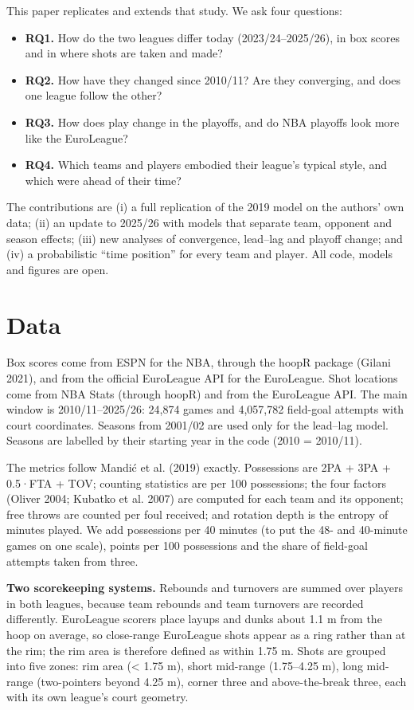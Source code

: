 \documentclass[
  11pt,
  a4paper,
]{article}
\providecommand{\tightlist}{%
  \setlength{\itemsep}{0pt}\setlength{\parskip}{0pt}}\usepackage{longtable,booktabs,array}
\begin{document}
This paper replicates and extends that study. We ask four questions:

\begin{itemize}
\tightlist
\item
  \textbf{RQ1.} How do the two leagues differ today (2023/24--2025/26),
  in box scores and in where shots are taken and made?
\item
  \textbf{RQ2.} How have they changed since 2010/11? Are they
  converging, and does one league follow the other?
\item
  \textbf{RQ3.} How does play change in the playoffs, and do NBA
  playoffs look more like the EuroLeague?
\item
  \textbf{RQ4.} Which teams and players embodied their league's typical
  style, and which were ahead of their time?
\end{itemize}

The contributions are (i) a full replication of the 2019 model on the
authors' own data; (ii) an update to 2025/26 with models that separate
team, opponent and season effects; (iii) new analyses of convergence,
lead--lag and playoff change; and (iv) a probabilistic ``time position''
for every team and player. All code, models and figures are open.

\section{Data}\label{data}

Box scores come from ESPN for the NBA, through the hoopR package (Gilani
2021), and from the official EuroLeague API for the EuroLeague. Shot
locations come from NBA Stats (through hoopR) and from the EuroLeague
API. The main window is 2010/11--2025/26: 24,874 games and 4,057,782
field-goal attempts with court coordinates. Seasons from 2001/02 are
used only for the lead--lag model. Seasons are labelled by their
starting year in the code (2010 = 2010/11).

The metrics follow Mandić et al. (2019) exactly. Possessions are 2PA +
3PA + 0.5·FTA + TOV; counting statistics are per 100 possessions; the
four factors (Oliver 2004; Kubatko et al. 2007) are computed for each
team and its opponent; free throws are counted per foul received; and
rotation depth is the entropy of minutes played. We add possessions per
40 minutes (to put the 48- and 40-minute games on one scale), points per
100 possessions and the share of field-goal attempts taken from three.

\textbf{Two scorekeeping systems.} Rebounds and turnovers are summed
over players in both leagues, because team rebounds and team turnovers
are recorded differently. EuroLeague scorers place layups and dunks
about 1.1 m from the hoop on average, so close-range EuroLeague shots
appear as a ring rather than at the rim; the rim area is therefore
defined as within 1.75 m. Shots are grouped into five zones: rim area
(\textless{} 1.75 m), short mid-range (1.75--4.25 m), long mid-range
(two-pointers beyond 4.25 m), corner three and above-the-break three,
each with its own league's court geometry.
\end{document}
